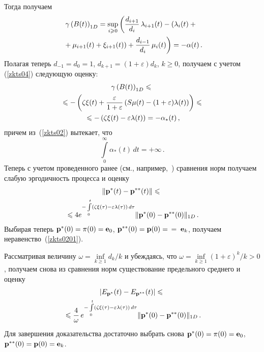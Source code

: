 \begin{multicols}{2}
Тогда получаем
\begin{multline}
\gamma \left(B(t)\right)_{1D} = \sup\limits_{i \ge 0}
\left(\fr{d_{i+1}}{d_i}\,
 \lambda_{i+1}(t) - \left(\lambda_i(t) +{}\right.\right.\\
\left.\left. {}+\mu_{i+1}(t)
+\xi_{i+1}(t)\right) +  \fr{d_{i-1}}{d_i}\, \mu_i(t) \right) = -
\alpha(t)\,.
\label{zkts04}
\end{multline}
Полагая теперь $d_{-1}=d_0=1$, $d_{k+1}=(1+\varepsilon)d_k$, $k \ge 0$,  получаем с учетом~ (\ref{zkts04})
следующую оценку:
\begin{multline}
\gamma \left(B(t)\right)_{1D} \le{}\\
{}\le  -\left(\zeta\xi(t) + \fr{\varepsilon}{1+\varepsilon}\left(S\mu(t)-
(1+\varepsilon)\lambda(t)\right)\right) \le{}\\
{}\le -\left(\zeta\xi(t)  - \varepsilon\lambda(t)\right)  = -\alpha_*(t)\,,
\label{zkts040}
\end{multline}
причем из~(\ref{zkts02}) вытекает, что
$$
\int\limits_0^{\infty} \alpha_*(t) \, dt = + \infty\,.
$$
Теперь с учетом проведенного ранее (см., например,~\cite{z06}) сравнения норм получаем слабую
эргодичность процесса и оценку
\begin{multline*}
\|{\bf p}^*(t)-{\bf p}^{**}(t)\| \le{}\\
{}\le4 e^{-\int\limits_0^t
\left(\zeta\xi(\tau) - \varepsilon \lambda(\tau)\right)\, d\tau} \|{\bf p}^*(0)-{\bf p}^{**}(0)\|_{1D}\,.
\end{multline*}
Выбирая теперь ${\bf p}^*(0) = {\bf \pi}(0)={\bf e}_0$, ${\bf p}^{**}(0) = {\bf p}(0)=$\linebreak
$=\; {\bf e}_k$,
получаем неравенство~(\ref{zkts0201}).

Рассматривая величину $\omega = \inf\limits_{k \ge 1} d_k/k$ и убеждаясь, что
$\omega = \inf\limits_{k \ge 1} \left(1+\varepsilon\right)^k/k > 0 $,
получаем снова из сравнения норм существование предельного среднего и оценку
\begin{multline*}
|E_{\bf p^*}(t) - E_{\bf p^{**}}(t)| \le{}\\
{}\le \fr{4}{\omega}\, e^{-\int\limits_0^t
\left(\zeta\xi(\tau) - \varepsilon \lambda(\tau)\right)\, d\tau} \|{\bf p}^*(0)-{\bf p}^{**}(0)\|_{1D}\,.
\end{multline*}
Для завершения доказательства достаточно выбрать снова ${\bf p}^*(0) = {\bf \pi}(0)= {\bf e}_0$,
${\bf p}^{**}(0) = {\bf p}(0)= {\bf e}_k$.


\end{multicols}
